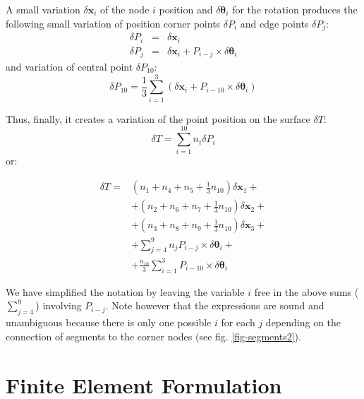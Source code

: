 \documentclass{egpubl}
\begin{document}
A small variation $\delta \mathbf{x}_i$ of the node $i$ position and $\delta \mathbf{\theta}_i$ for the rotation produces the following small variation of position corner points $\delta P_i$ and edge points $\delta P_j$:
%
\begin{eqnarray}
    \delta P_i & = & \delta \mathbf{x}_i \\
    \delta P_j & = & \delta \mathbf{x}_i +  P_{i-j} \times \delta \mathbf{\theta}_i
\end{eqnarray}
%
and variation of central point $\delta P_{10}$:
%
\begin{equation}
    \delta P_{10} = \frac{1}{3} \sum_{i=1}^3 \left(
    \delta \mathbf{x}_i + P_{i-10} \times \delta \mathbf{\theta}_i \right)
\end{equation}

Thus, finally, it creates a variation of the point position on the surface $\delta T$:
%
\begin{equation}
    \delta T = \sum_{i=1}^{10} n_i  \delta P_i
\end{equation}
%
or:

\begin{equation}\label{eq-bez-delta}
    \begin{split}
        \delta T = &   (n_1 + n_4 + n_5 + \frac{1}{3} n_{10})  \delta \mathbf{x}_1 + \\
                   & + (n_2 + n_6 + n_7 + \frac{1}{3} n_{10})  \delta \mathbf{x}_2 + \\
                   & + (n_3 + n_8 + n_9 + \frac{1}{3} n_{10})  \delta \mathbf{x}_3 + \\
                   & + \sum_{j=4}^9 n_j P_{i-j} \times \delta \mathbf{\theta}_i + \\
                   & + \frac{n_{10}}{3} \sum_{i=1}^3 P_{i-10} \times \delta \mathbf{\theta}_i 
    \end{split}
\end{equation}

We have simplified the notation by leaving the variable $i$ free in the above sums ($\sum_{j=4}^9$) involving $P_{i-j}$.
Note however that the expressions are sound and unambiguous because there is only one possible $i$ for each $j$ depending on the connection of segments to the corner nodes (see fig. \ref{fig-segments2}).





\section{Finite Element Formulation} %
\end{document}
